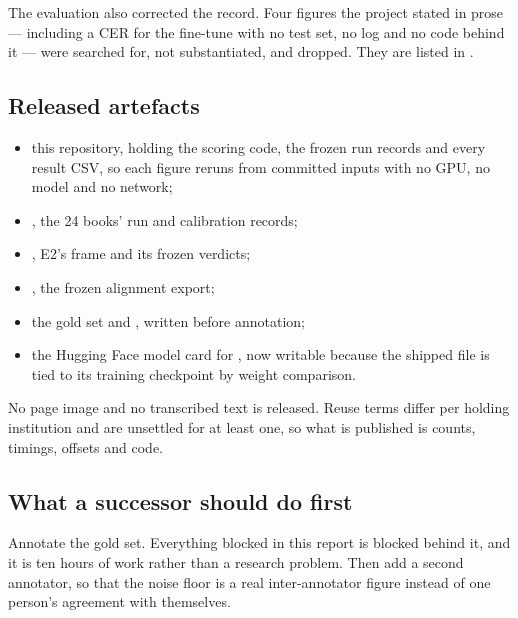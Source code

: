The evaluation also corrected the record. Four figures the project stated in
prose --- including a CER for the fine-tune with no test set, no log and no
code behind it --- were searched for, not substantiated, and dropped. They are
listed in .

\subsection{Released artefacts}

\begin{itemize}
  \item this repository, holding the scoring code, the frozen run records and
    every result CSV, so each figure reruns from committed inputs with no GPU,
    no model and no network;
  \item {}, the 24 books' run and calibration records;
  \item {}, E2's frame and its frozen verdicts;
  \item {}, the frozen alignment export;
  \item the gold set and , written before
    annotation;
  \item the Hugging Face model card for , now writable
    because the shipped file is tied to its training checkpoint by weight
    comparison.
\end{itemize}

No page image and no transcribed text is released. Reuse terms differ per
holding institution and are unsettled for at least one, so what is published is
counts, timings, offsets and code.

\subsection{What a successor should do first}

Annotate the gold set. Everything blocked in this report is blocked behind it,
and it is ten hours of work rather than a research problem. Then add a second
annotator, so that the noise floor is a real inter-annotator figure instead of
one person's agreement with themselves.

